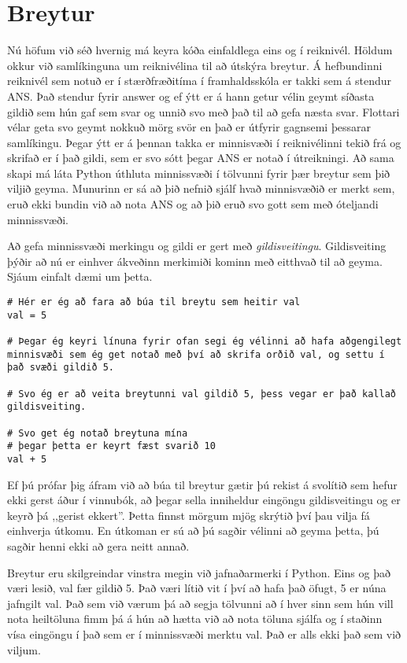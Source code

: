 \documentclass[11pt,fleqn]{book} %
\begin{document}
\section{Breytur}
Nú höfum við séð hvernig má keyra kóða einfaldlega eins og í reiknivél.
Höldum okkur við samlíkinguna um reiknivélina til að útskýra breytur.
Á hefbundinni reiknivél sem notuð er í stærðfræðitíma í framhaldsskóla er takki sem á stendur ANS.
Það stendur fyrir answer og ef ýtt er á hann getur vélin geymt síðasta gildið sem hún gaf sem svar og unnið svo með það til að gefa næsta svar.
Flottari vélar geta svo geymt nokkuð mörg svör en það er útfyrir gagnsemi þessarar samlíkingu.
Þegar ýtt er á þennan takka er minnisvæði í reiknivélinni tekið frá og skrifað er í það gildi, sem er svo sótt þegar ANS er notað í útreikningi.
Að sama skapi má láta Python úthluta minnissvæði í tölvunni fyrir þær breytur sem þið viljið geyma.
Munurinn er sá að þið nefnið sjálf hvað minnisvæðið er merkt sem, eruð ekki bundin við að nota ANS og að þið eruð svo gott sem með óteljandi minnissvæði.

Að gefa minnissvæði merkingu og gildi er gert með \textit{gildisveitingu}.
Gildisveiting þýðir að nú er einhver ákveðinn merkimiði kominn með eitthvað til að geyma.
Sjáum einfalt dæmi um þetta.

\begin{lstlisting}[caption=Breytur kynntar]
# Hér er ég að fara að búa til breytu sem heitir val
val = 5

# Þegar ég keyri línuna fyrir ofan segi ég vélinni að hafa aðgengilegt minnisvæði sem ég get notað með því að skrifa orðið val, og settu í það svæði gildið 5.

# Svo ég er að veita breytunni val gildið 5, þess vegar er það kallað gildisveiting.

# Svo get ég notað breytuna mína
# þegar þetta er keyrt fæst svarið 10
val + 5
\end{lstlisting}

Ef þú prófar þig áfram við að búa til breytur gætir þú rekist á svolítið sem hefur ekki gerst áður í vinnubók, að þegar sella inniheldur eingöngu gildisveitingu og er keyrð þá ,,gerist ekkert''.
Þetta finnst mörgum mjög skrýtið því þau vilja fá einhverja útkomu.
En útkoman er sú að þú sagðir vélinni að geyma þetta, þú sagðir henni ekki að gera neitt annað.

Breytur eru skilgreindar vinstra megin við jafnaðarmerki í Python.
Eins og það væri lesið, val fær gildið 5.
Það væri lítið vit í því að hafa það öfugt, 5 er núna jafngilt val.
Það sem við værum þá að segja tölvunni að í hver sinn sem hún vill nota heiltöluna fimm þá á hún að hætta við að nota töluna sjálfa og í staðinn vísa eingöngu í það sem er í minnissvæði merktu val.
Það er alls ekki það sem við viljum.
\end{document}
